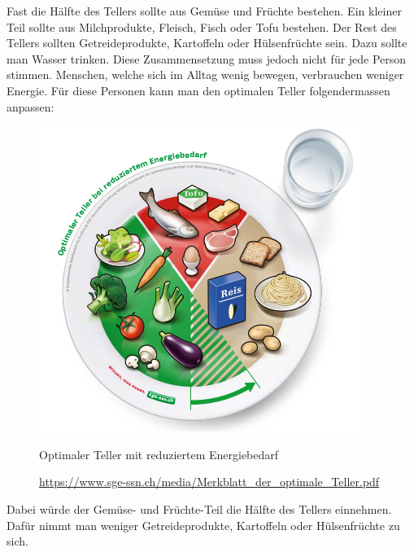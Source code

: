 Fast die Hälfte des Tellers sollte aus Gemüse und Früchte bestehen. Ein kleiner Teil sollte aus Milchprodukte, Fleisch, Fisch oder Tofu bestehen. Der Rest des Tellers sollten Getreideprodukte, Kartoffeln oder Hülsenfrüchte sein. Dazu sollte man Wasser trinken.
\newline
Diese Zusammensetzung muss jedoch nicht für jede Person stimmen. Menschen, welche sich im Alltag wenig bewegen, verbrauchen weniger Energie. Für diese Personen kann man den optimalen Teller folgendermassen anpassen:
\newline
\begin{figure}[!hbpt]
  \centering
  \includegraphics[width=0.5\linewidth]{./images/optimale_teller_energie.png}
  \caption{Optimaler Teller mit reduziertem Energiebedarf}
  \label{fig:teller_2}
  \caption*{\url{https://www.sge-ssn.ch/media/Merkblatt_der_optimale_Teller.pdf}}
\end{figure}
\newline
Dabei würde der Gemüse- und Früchte-Teil die Hälfte des Tellers einnehmen. Dafür nimmt man weniger Getreideprodukte, Kartoffeln oder Hülsenfrüchte zu sich.
